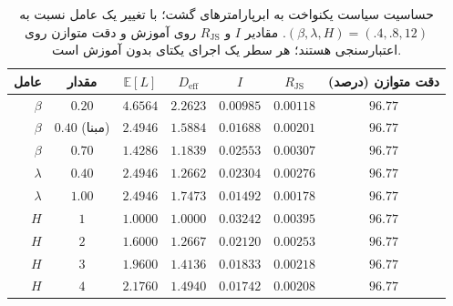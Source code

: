 \begin{table}[htbp]
\centering\small
\caption{حساسیت سیاست یکنواخت به ابرپارامترهای گشت؛ با تغییر یک عامل نسبت به $(\beta,\lambda,H)=(.4,.8,12)$. مقادیر $I$ و $R_{\mathrm{JS}}$ روی آموزش و دقت متوازن روی اعتبارسنجی هستند؛ هر سطر یک اجرای یکتای بدون آموزش است.}
\label{tab:ch4-uniform-hyperparams-exact}
\begin{tabular}{rcccccc}\hline
عامل & مقدار & $\mathbb E[L]$ & $D_{\mathrm{eff}}$ & $I$ & $R_{\mathrm{JS}}$ & دقت متوازن (درصد)\\\hline
$\beta$ & $0.20$ & $4.6564$ & $2.2623$ & $0.00985$ & $0.00118$ & $96.77$\\
$\beta$ & $0.40$ (مبنا) & $2.4946$ & $1.5884$ & $0.01688$ & $0.00201$ & $96.77$\\
$\beta$ & $0.70$ & $1.4286$ & $1.1839$ & $0.02553$ & $0.00307$ & $96.77$\\
$\lambda$ & $0.40$ & $2.4946$ & $1.2662$ & $0.02304$ & $0.00276$ & $96.77$\\
$\lambda$ & $1.00$ & $2.4946$ & $1.7473$ & $0.01492$ & $0.00178$ & $96.77$\\
$H$ & $1$ & $1.0000$ & $1.0000$ & $0.03242$ & $0.00395$ & $96.77$\\
$H$ & $2$ & $1.6000$ & $1.2667$ & $0.02120$ & $0.00253$ & $96.77$\\
$H$ & $3$ & $1.9600$ & $1.4136$ & $0.01833$ & $0.00218$ & $96.77$\\
$H$ & $4$ & $2.1760$ & $1.4940$ & $0.01742$ & $0.00208$ & $96.77$\\
\hline
\end{tabular}
\end{table}
